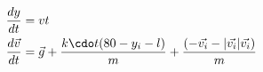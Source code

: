 \documentclass[preview]{standalone}
\begin{document}
\begin{align*}
\quad\\
            \frac{dy}{d t }&=v t      \quad\\
            \frac{d\vec{v}}{d t }&=\vec{g}+\frac{k\cdo t (80-y_i-l)}{m}+\frac{(-\vec{v_i}-|\vec{v_i}|\vec{v_i})}{m}
\end{align*}
\end{document}
